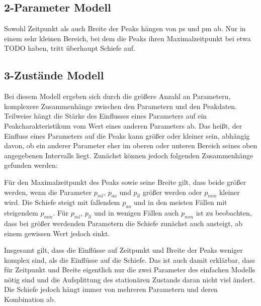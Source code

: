 \subsection{2-Parameter Modell} 

Sowohl Zeitpunkt als auch Breite der Peaks hängen von ps und pm ab.
Nur in einem sehr kleinen Bereich, bei dem die Peaks ihren Maximalzeitpunkt bei etwa TODO haben, tritt überhaupt Schiefe auf. 


\subsection{3-Zustände Modell}
Bei diesem Modell ergeben sich durch die größere Anzahl an Parametern, komplexere Zusammenhänge zwischen den Parametern und den Peakdaten. Teilweise hängt die Stärke des Einflusses eines Parameters auf ein Peakcharakteristikum vom Wert eines anderen Parameters ab. Das heißt, der Einfluss eines Parameters auf die Peaks kann größer oder kleiner sein, abhängig davon, ob ein anderer Parameter eher im oberen oder unteren Bereich seines oben angegebenen Intervalls liegt.
Zunächst können jedoch folgenden Zusammenhänge gefunden werden:

Für den Maximalzeitpunkt des Peaks sowie seine Breite gilt, dass beide größer werden, wenn die Parameter $p_{ml}$, $p_{aa}$ und $p_{ll}$ größer werden oder $p_{mm}$ kleiner wird. 
Die Schiefe steigt mit fallendem $p_{aa}$ und in den meisten Fällen mit steigendem $p_{mm}$. Für $p_{ml}$, $p_{ll}$ und in wenigen Fällen auch $p_{mm}$ ist zu beobachten, dass bei größer werdenden Parametern die Schiefe zunächst auch ansteigt, ab einem gewissen Wert jedoch sinkt.

Insgesamt gilt, dass die Einflüsse auf Zeitpunkt und Breite der Peaks weniger komplex sind, als die Einflüsse auf die Schiefe. Das ist auch damit erklärbar, dass für Zeitpunkt und Breite eigentlich nur die zwei Parameter des einfachen Modells nötig sind und die Aufsplittung des stationären Zustands daran nicht viel ändert. Die Schiefe jedoch hängt immer von mehreren Parametern und deren Kombination ab.

